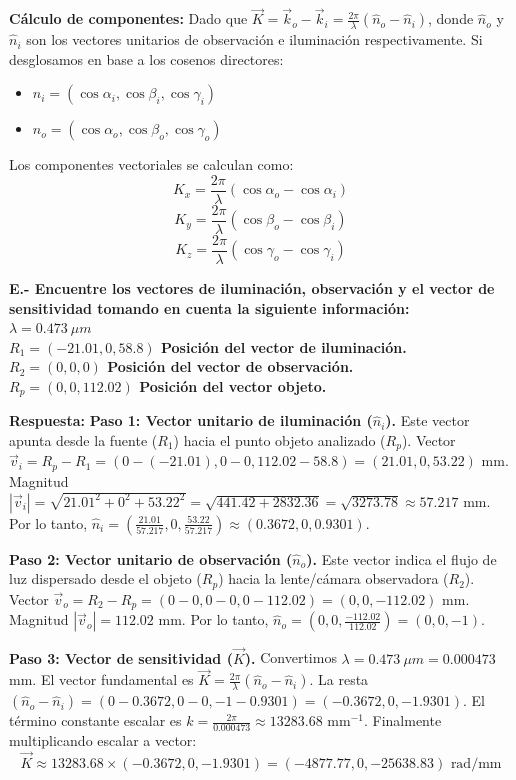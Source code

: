 \documentclass[12pt,letterpaper]{article}
\begin{document}
	\textbf{Cálculo de componentes:}
	Dado que $\vec{K} = \vec{k}_o - \vec{k}_i = \frac{2\pi}{\lambda}(\hat{n}_o - \hat{n}_i)$, donde $\hat{n}_o$ y $\hat{n}_i$ son los vectores unitarios de observación e iluminación respectivamente. Si desglosamos en base a los cosenos directores:
	\begin{itemize}
		\item $\hat{n}_i = (\cos\alpha_i, \cos\beta_i, \cos\gamma_i)$
		\item $\hat{n}_o = (\cos\alpha_o, \cos\beta_o, \cos\gamma_o)$
	\end{itemize}
	Los componentes vectoriales se calculan como:
	\[
	K_x = \frac{2\pi}{\lambda} (\cos\alpha_o - \cos\alpha_i)
	\]
	\[
	K_y = \frac{2\pi}{\lambda} (\cos\beta_o - \cos\beta_i)
	\]
	\[
	K_z = \frac{2\pi}{\lambda} (\cos\gamma_o - \cos\gamma_i)
	\]
	
	\vspace{0.8cm}
	\noindent \textbf{E.- Encuentre los vectores de iluminación, observación y el vector de sensitividad tomando en cuenta la siguiente información:\\
		$\lambda = 0.473~\mu m$\\
		$R_1 = (-21.01, 0, 58.8)$ Posición del vector de iluminación.\\
		$R_2 = (0, 0, 0)$ Posición del vector de observación.\\
		$R_p = (0, 0, 112.02)$ Posición del vector objeto.}
	
	\textbf{Respuesta:}
	\textbf{Paso 1: Vector unitario de iluminación ($\hat{n}_i$).}
	Este vector apunta desde la fuente ($R_1$) hacia el punto objeto analizado ($R_p$).
	Vector $\vec{v}_i = R_p - R_1 = (0 - (-21.01), 0 - 0, 112.02 - 58.8) = (21.01, 0, 53.22)$ mm.
	Magnitud $|\vec{v}_i| = \sqrt{21.01^2 + 0^2 + 53.22^2} = \sqrt{441.42 + 2832.36} = \sqrt{3273.78} \approx 57.217$ mm.
	Por lo tanto, $\hat{n}_i = \left(\frac{21.01}{57.217}, 0, \frac{53.22}{57.217}\right) \approx (0.3672, 0, 0.9301)$.
	
	\textbf{Paso 2: Vector unitario de observación ($\hat{n}_o$).}
	Este vector indica el flujo de luz dispersado desde el objeto ($R_p$) hacia la lente/cámara observadora ($R_2$).
	Vector $\vec{v}_o = R_2 - R_p = (0 - 0, 0 - 0, 0 - 112.02) = (0, 0, -112.02)$ mm.
	Magnitud $|\vec{v}_o| = 112.02$ mm.
	Por lo tanto, $\hat{n}_o = \left(0, 0, \frac{-112.02}{112.02}\right) = (0, 0, -1)$.
	
	\textbf{Paso 3: Vector de sensitividad ($\vec{K}$).}
	Convertimos $\lambda = 0.473~\mu m = 0.000473~$mm.
	El vector fundamental es $\vec{K} = \frac{2\pi}{\lambda} (\hat{n}_o - \hat{n}_i)$.
	La resta $(\hat{n}_o - \hat{n}_i) = (0 - 0.3672, 0 - 0, -1 - 0.9301) = (-0.3672, 0, -1.9301)$.
	El término constante escalar es $k = \frac{2\pi}{0.000473} \approx 13283.68 \text{ mm}^{-1}$.
	Finalmente multiplicando escalar a vector:
	\[
	\vec{K} \approx 13283.68 \times (-0.3672, 0, -1.9301) = (-4877.77, 0, -25638.83) \text{ rad/mm}
	\]
	
\end{document}
